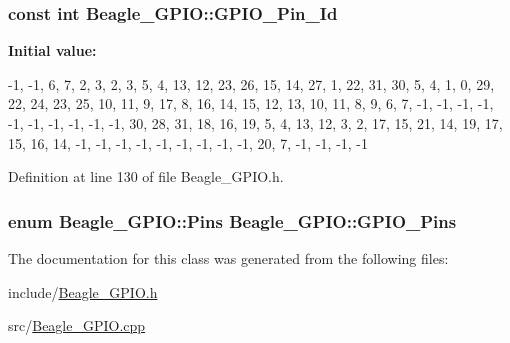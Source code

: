 \hypertarget{class_beagle___g_p_i_o_a9a48339b54de8e6c884ddad8629a3647}{
\subsubsection[{\-G\-P\-I\-O\-\_\-\-Pin\-\_\-\-Id}]{\setlength{\rightskip}{0pt plus 5cm}const int {\bf \-Beagle\-\_\-\-G\-P\-I\-O\-::\-G\-P\-I\-O\-\_\-\-Pin\-\_\-\-Id}}}\label{class_beagle___g_p_i_o_a9a48339b54de8e6c884ddad8629a3647}
{\bfseries \-Initial value\-:}
\begin{DoxyCode}
 
{
        -1, -1,  6,  7,  2,     
         3,  2,  3,  5,  4,     
        13, 12, 23, 26, 15,     
        14, 27,  1, 22, 31,     
        30,  5,  4,  1,  0,     
        29, 22, 24, 23, 25,     
        10, 11,  9, 17,  8,     
        16, 14, 15, 12, 13,     
        10, 11,  8,  9,  6,     
         7,                     
        -1, -1, -1, -1, -1,     
        -1, -1, -1, -1, -1,     
        30, 28, 31, 18, 16,     
        19,  5,  4, 13, 12,     
         3,  2, 17, 15, 21,     
        14, 19, 17, 15, 16,     
        14, -1, -1, -1, -1,     
        -1, -1, -1, -1, -1,     
        20,  7, -1, -1, -1,     
        -1                      
}
\end{DoxyCode}


\-Definition at line 130 of file \-Beagle\-\_\-\-G\-P\-I\-O.\-h.

\hypertarget{class_beagle___g_p_i_o_ae173a49845ccc4d980cc0eb83a990418}{
\subsubsection[{\-G\-P\-I\-O\-\_\-\-Pins}]{\setlength{\rightskip}{0pt plus 5cm}enum {\bf \-Beagle\-\_\-\-G\-P\-I\-O\-::\-Pins}  {\bf \-Beagle\-\_\-\-G\-P\-I\-O\-::\-G\-P\-I\-O\-\_\-\-Pins}}}\label{class_beagle___g_p_i_o_ae173a49845ccc4d980cc0eb83a990418}


\-The documentation for this class was generated from the following files\-:\begin{DoxyCompactItemize}
\item 
include/\hyperlink{_beagle___g_p_i_o_8h}{\-Beagle\-\_\-\-G\-P\-I\-O.\-h}\item 
src/\hyperlink{_beagle___g_p_i_o_8cpp}{\-Beagle\-\_\-\-G\-P\-I\-O.\-cpp}\end{DoxyCompactItemize}
